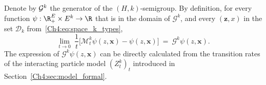 \begin{refsegment}
Denote by ${\cal G}^k$  the generator of the $(H,k)$-semigroup.
By definition, for every function $\psi:\R_+^E\times E^k\to\R$ that is in the domain of $\mathcal G^k$, and every $(\bm z, x)$ in the set $\mathscr{D}_{k}$ from~\eqref{Ch4:eq:space_k_types},
\[
\lim_{t\to 0}\ \frac{1}{t}\Big[\mathcal{ M}^k_t\psi(z,\bm x)-\psi(z,\bm x)\Big]\ =\ \mathcal{G}^k \psi(z,\bm x).
\]
The expression of $\mathcal{G}^k\psi(z,\bm x)$ can be directly calculated from the transition rates of the interacting particle model $(Z^k_t)_t$ introduced in Section~\ref{Ch4:sec:model_formal}.



\end{refsegment}
